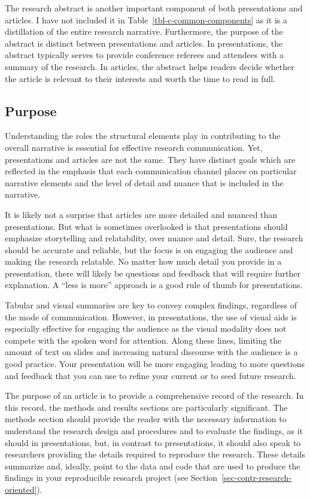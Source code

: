 \documentclass[
  letterpaper,
]{latex/krantz}
\theoremstyle{definition}
\theoremstyle{remark}
\begin{document}
The research abstract is another important component of both
presentations and articles. I have not included it in
Table~\ref{tbl-c-common-components} as it is a distillation of the
entire research narrative. Furthermore, the purpose of the abstract is
distinct between presentations and articles. In presentations, the
abstract typically serves to provide conference referees and attendees
with a summary of the research. In articles, the abstract helps readers
decide whether the article is relevant to their interests and worth the
time to read in full.

\subsection{Purpose}\label{sec-contr-ao-purpose}

Understanding the roles the structural elements play in contributing to
the overall narrative is essential for effective research communication.
Yet, presentations and articles are not the same. They have distinct
goals which are reflected in the emphasis that each communication
channel places on particular narrative elements and the level of detail
and nuance that is included in the narrative.

It is likely not a surprise that articles are more detailed and nuanced
than presentations. But what is sometimes overlooked is that
presentations should emphasize storytelling and relatability, over
nuance and detail. Sure, the research should be accurate and reliable,
but the focus is on engaging the audience and making the research
relatable. No matter how much detail you provide in a presentation,
there will likely be questions and feedback that will require further
explanation. A ``less is more'' approach is a good rule of thumb for
presentations.

Tabular and visual summaries are key to convey complex findings,
regardless of the mode of communication. However, in presentations, the
use of visual aids is especially effective for engaging the audience as
the visual modality does not compete with the spoken word for attention.
Along these lines, limiting the amount of text on slides and increasing
natural discourse with the audience is a good practice. Your
presentation will be more engaging leading to more questions and
feedback that you can use to refine your current or to seed future
research.

The purpose of an article is to provide a comprehensive record of the
research. In this record, the methods and results sections are
particularly significant. The methods section should provide the reader
with the necessary information to understand the research design and
procedures and to evaluate the findings, as it should in presentations,
but, in contrast to presentations, it should also speak to researchers
providing the details required to reproduce the research. These details
summarize and, ideally, point to the data and code that are used to
produce the findings in your reproducible research project (see
Section~\ref{sec-contr-research-oriented}).
\end{document}
